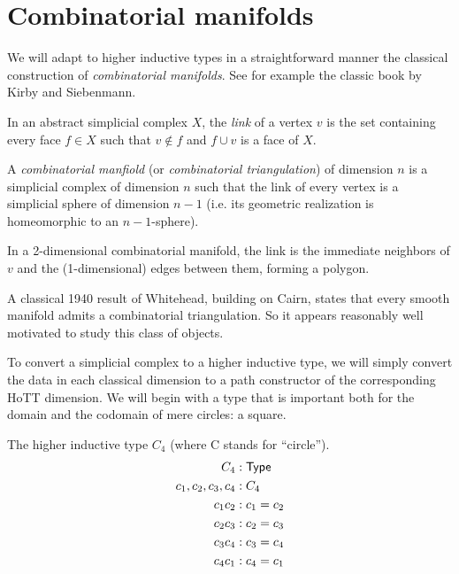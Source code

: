 \section{Combinatorial manifolds}

We will adapt to higher inductive types in a straightforward manner the classical construction of \emph{combinatorial manifolds}. See for example the classic book by Kirby and Siebenmann\cite{kirby_siebenmann}.

\begin{mydef}
In an abstract simplicial complex \( X \), the \emph{link} of a vertex \( v \) is the set containing every face \( f\in X \) such that \( v\notin f \) and \( f\cup v \) is a face of \( X \).
\end{mydef}

\begin{mydef}
A \emph{combinatorial manfiold} (or \emph{combinatorial triangulation}) of dimension \( n \) is a simplicial complex of dimension \( n \) such that the link of every vertex is a simplicial sphere of dimension \( n-1 \) (i.e. its geometric realization is homeomorphic to an \( n-1 \)-sphere).
\end{mydef}

In a 2-dimensional combinatorial manifold, the link is the immediate neighbors of \( v \) and the (1-dimensional) edges between them, forming a polygon.

A classical 1940 result of Whitehead, building on Cairn, states that every smooth manifold admits a combinatorial triangulation\cite{whitehead_triangulation}. So it appears reasonably well motivated to study this class of objects.

To convert a simplicial complex to a higher inductive type, we will simply convert the data in each classical dimension to a path constructor of the corresponding HoTT dimension. We will begin with a type that is important both for the domain and the codomain of mere circles: a square.

\begin{mydef}
The higher inductive type \( C_4 \) (where C stands for ``circle'').
\begin{align*}
C_4 &: \mathsf{Type} \\
c_1, c_2, c_3, c_4 &: C_4 \\
c_1c_2 &: c_1 = c_2 \\
c_2c_3 &: c_2 = c_3 \\
c_3c_4 &: c_3 = c_4 \\
c_4c_1 &: c_4 = c_1 \\
\end{align*}
\end{mydef}

